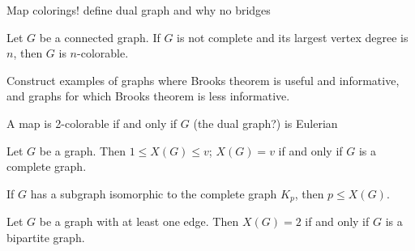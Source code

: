 \begin{definition} Map colorings!  define dual graph and why no bridges
\end{definition}

\begin{definition}[Brooks] Let $G$ be a connected graph.  If $G$ is not complete and its largest vertex degree is $n$, then $G$ is $n$-colorable.
\end{definition}

\begin{examples}  Construct examples of graphs where Brooks theorem is useful and informative, and graphs for which Brooks theorem is less informative.
\end{examples}

\begin{theorem} A map is 2-colorable if and only if $G$ (the dual graph?) is Eulerian
\end{theorem}

\begin{theorem} Let $G$ be a graph.  Then $1 \leq X(G) \leq v$; $X(G) = v$ if and only if $G$ is a complete graph.
\end{theorem}

\begin{corollary} If $G$ has a subgraph isomorphic to the complete graph $K_p$, then $p \leq X(G)$.
\end{corollary}

\begin{theorem} Let $G$ be a graph with at least one edge.  Then $X(G)=2$ if and only if $G$ is a bipartite graph.
\end{theorem}
